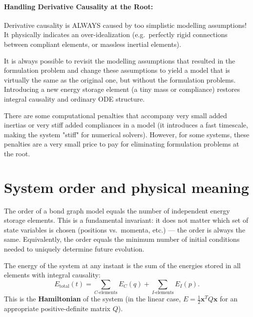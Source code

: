 \paragraph{Handling Derivative Causality at the Root:}
Derivative causality is ALWAYS caused by too simplistic modelling assumptions! It physically indicates an over-idealization (e.g.\ perfectly rigid connections between compliant elements, or massless inertial elements). 

It is always possible to revisit the modelling assumptions that resulted in the formulation problem and change these assumptions to yield a model that is virtually the same as the original one, but without the formulation problems. Introducing a new energy storage element (a tiny mass or compliance) restores integral causality and ordinary ODE structure. 

There are some computational penalties that accompany very small added inertias or very stiff added compliances in a model (it introduces a fast timescale, making the system "stiff" for numerical solvers). However, for some systems, these penalties are a very small price to pay for eliminating formulation problems at the root.

\section{System order and physical meaning}

The order of a bond graph model equals the number of independent energy storage elements. This is a fundamental invariant: it does not matter which set of state variables is chosen (positions vs.\ momenta, etc.) — the order is always the same. Equivalently, the order equals the minimum number of initial conditions needed to uniquely determine future evolution.

The energy of the system at any instant is the sum of the energies stored in all elements with integral causality:
\begin{equation}
  E_{\mathrm{total}}(t) = \sum_{C\text{-elements}} E_C(q) + \sum_{I\text{-elements}} E_I(p).
\end{equation}
This is the \textbf{Hamiltonian} of the system (in the linear case, $E = \frac{1}{2}\mathbf{x}^T Q \mathbf{x}$ for an appropriate positive-definite matrix $Q$).